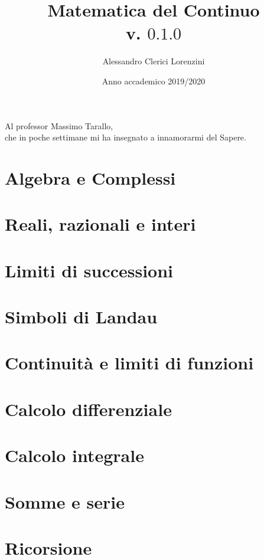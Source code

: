 \documentclass[a4paper,twoside]{report}
\begin{document}
\title{Matematica del Continuo\\
	\normalsize v. $0.1.0$ }
\author{Alessandro Clerici Lorenzini}
\date{Anno accademico 2019/2020}
\maketitle
\tableofcontents

\begin{dedication}
	Al professor Massimo Tarallo,\\
	che in poche settimane mi ha insegnato a innamorarmi del Sapere.
\end{dedication}


\chapter{Algebra e Complessi}




\chapter{Reali, razionali e interi}



\chapter{Limiti di successioni}



\chapter{Simboli di Landau}




\chapter{Continuità e limiti di funzioni}






\chapter{Calcolo differenziale}





\chapter{Calcolo integrale}




\chapter{Somme e serie}




\chapter{Ricorsione}

\end{document}

